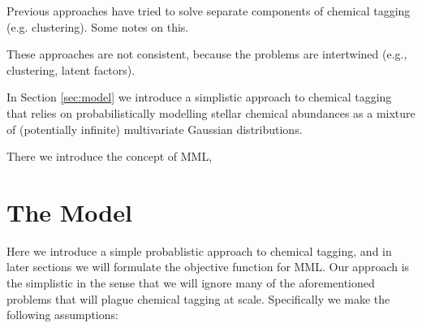 \documentclass{aastex61}
\begin{document}
Previous approaches have tried to solve separate components of chemical tagging (e.g. clustering). Some notes on this.

These approaches are not consistent, because the problems are intertwined (e.g., clustering, latent factors).






In Section \ref{sec:model} we introduce a simplistic approach to chemical
tagging that relies on probabilistically modelling stellar chemical abundances
as a mixture of (potentially infinite) multivariate Gaussian distributions.

There we introduce the concept of MML,


\section{The Model}
\label{sec:the-model}

Here we introduce a simple probablistic approach to chemical tagging, and in
later sections we will formulate the objective function for MML. Our approach is
the simplistic in the sense that we will ignore many of the aforementioned
problems that will plague chemical tagging at scale. Specifically we make the
following assumptions:
\end{document}

